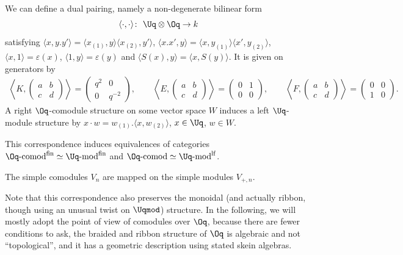 \begin{Definition}
We can define a dual pairing, namely a non-degenerate bilinear form
\[
\langle \cdot,\cdot\rangle \colon \  \Uq \otimes \Oq \to k
\] satisfying $\langle x, y.y'\rangle = \langle x_{(1)},y\rangle \langle x_{(2)},y'\rangle$, $\langle x.x', y\rangle = \langle x,y_{(1)}\rangle \langle x',y_{(2)}\rangle$, $\langle x,1\rangle = \varepsilon(x)$, $\langle 1,y\rangle = \varepsilon(y)$ and $\langle S(x),y\rangle = \langle x,S(y)\rangle$. It is given on generators by
\begin{gather*}
 \left\langle K,\begin{pmatrix}a&b\\c&d \end{pmatrix} \right\rangle =
 \begin{pmatrix}q^2&0\\0&q^{-2} \end{pmatrix}\!, \qquad \!
 \left\langle E,
 \begin{pmatrix}a&b\\c&d \end{pmatrix} \right\rangle =
 \begin{pmatrix}0&1\\0&0 \end{pmatrix}\!,\qquad \!
 \left\langle F,\begin{pmatrix} a&b\\c&d \end{pmatrix}\right\rangle =
 \begin{pmatrix}0&0\\1&0 \end{pmatrix}\!.
 \end{gather*}
 A right $\Oq$-comodule structure on some vector space $W$ induces a left $\Uq$-module structure by $x\cdot w = w_{(1)}. \langle x,w_{(2)} \rangle$, $x \in \Uq$, $w\in W$.
\end{Definition}

\begin{Proposition}\label{propOqcomodUqmod}
This correspondence induces equivalences of categories $\Oq\text{-}{\rm comod}^{\rm fin}\simeq \Uq\text{-}{\rm mod}^{\rm fin}$ and $\Oq\text{-}{\rm comod} \simeq \Uq\text{-}{\rm mod}^{\rm lf}$.

The simple comodules $V_n$ are mapped on the simple modules $V_{+,n}$.
\end{Proposition}

Note that this correspondence also preserves the monoidal (and actually ribbon, though using an unusual twist on $\Uqmod$) structure. In the following, we will mostly adopt the point of view of comodules over $\Oq$, because there are fewer conditions to ask, the braided and ribbon structure of $\Oq$ is algebraic and not ``topological'', and it has a geometric description using stated skein algebras.


